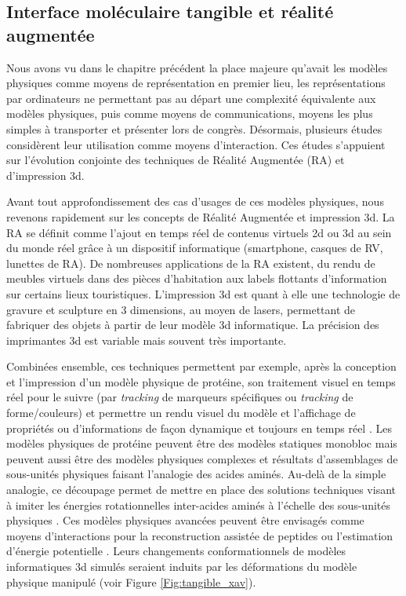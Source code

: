 \subsection{Interface moléculaire tangible et réalité augmentée}

Nous avons vu dans le chapitre précédent la place majeure qu'avait les modèles physiques comme moyens de représentation en premier lieu, les représentations par ordinateurs ne permettant pas au départ une complexité équivalente aux modèles physiques, puis comme moyens de communications, moyens les plus simples à transporter et présenter lors de congrès. Désormais, plusieurs études considèrent leur utilisation comme moyens d'interaction. Ces études s'appuient sur l'évolution conjointe des techniques de Réalité Augmentée (RA) et d'impression 3d. 

Avant tout approfondissement des cas d'usages de ces modèles physiques, nous revenons rapidement sur les concepts de Réalité Augmentée et impression 3d. La RA se définit comme l'ajout en temps réel de contenus virtuels 2d ou 3d au sein du monde réel grâce à un dispositif informatique (smartphone, casques de RV, lunettes de RA). De nombreuses applications de la RA existent, du rendu de meubles virtuels dans des pièces d'habitation aux labels flottants d'information sur certains lieux touristiques. 
L'impression 3d est quant à elle une technologie de gravure et sculpture en 3 dimensions, au moyen de lasers, permettant de fabriquer des objets à partir de leur modèle 3d informatique. La précision des imprimantes 3d est variable mais souvent très importante. 

Combinées ensemble, ces techniques permettent par exemple, après la conception et l'impression d'un modèle physique de protéine, son traitement visuel en temps réel pour le suivre (par \textit{tracking} de marqueurs spécifiques ou \textit{tracking} de forme/couleurs) et permettre un rendu visuel du modèle et l'affichage de propriétés ou d'informations de façon dynamique et toujours en temps réel \cite{gillet2005tangible}. 
Les modèles physiques de protéine peuvent être des modèles statiques monobloc mais peuvent aussi être des modèles physiques complexes et résultats d'assemblages de sous-unités physiques faisant l'analogie des acides aminés. Au-delà de la simple analogie, ce découpage permet de mettre en place des solutions techniques visant à imiter les énergies rotationnelles inter-acides aminés à l'échelle des sous-unités physiques \cite{chakraborty2013coarse}. Ces modèles physiques avancées peuvent être envisagés comme moyens d'interactions pour la reconstruction assistée de peptides ou l'estimation d'énergie potentielle \cite{martinez2015virtual}. Leurs changements conformationnels de modèles informatiques 3d simulés seraient induits par les déformations du modèle physique manipulé (voir Figure \ref{Fig:tangible_xav}).

